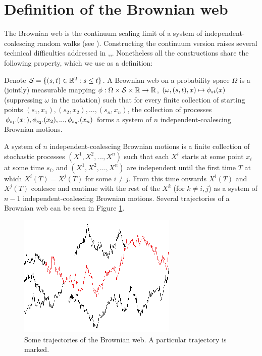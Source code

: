 {
\section{Definition of the Brownian web}
\label{sec:brownian-web-definition}

The Brownian web is the continuum scaling limit of a system of
independent-coalescing random walks (see
\cite{tsirelson-lecture-course}).  Constructing the
continuum version raises several technical difficulties addressed in
\cite{fontes-et-al},\cite{norris-turner},\cite{toth-werner}.
Nonetheless all the
constructions share the following property, which we use as a
definition:

\newcommand{\simplex}{\mathcal{S}}

  Denote $\simplex=\{(s, t) \in \R^2 : s \le t\}$.
  A Brownian web on a probability space $\Omega$ is a (jointly)
  measurable mapping $\webnoargs : \Omega \cross \simplex \cross \R
  \to \R$, $(\omega, (s, t), x) \mapsto \phi_{{s}{t}}(x)$ (suppressing
  $\omega$ in the notation) such that for every finite collection of
  starting points $(s_1, x_1),(s_2, x_2),...,(s_n, x_n)$, the
  collection of processes $\phi_{{s_1}{\cdot}}(x_1),
  \phi_{{s_2}{\cdot}}(x_2),...,\phi_{{s_n}{\cdot}}(x_n)$
  forms a system of $n$ independent-coalescing Brownian motions.

  \newcommand{\bm}[1]{X^{#1}}

  A system of $n$ independent-coalescing Brownian motions is a finite
  collection of stochastic processes $(\bm{1}, \bm{2},...,\bm{n})$ such that
  each $\bm{i}$ starts at some point $x_i$ at some time $s_i$, and $(\bm{1},
  \bm{2},...,\bm{n})$ are independent until the first time $T$ at which
  $\bm{i}(T)=\bm{j}(T)$ for some $i\neq j$. From this time onwards $\bm{i}(T)$
  and $\bm{j}(T)$ coalesce and continue with the rest of the $\bm{k}$ (for
  $k\neq i,j$) as a system of $n-1$ independent-coalescing Brownian motions.
  Several trajectories of a Brownian web can be seen in Figure
  \ref{fig:bw-trajectories}.

\begin{figure}
   \centering
   \includegraphics[scale=2]{sometraj.eps}
   \caption{Some trajectories of the Brownian web. A particular trajectory is marked.}
  \label{fig:bw-trajectories}
\end{figure}
}
